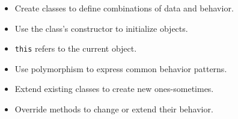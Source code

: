 \begin{itemize}
\item
  Create classes to define combinations of data and behavior.
\item
  Use the class's constructor to initialize objects.
\item
  \texttt{this} refers to the current object.
\item
  Use polymorphism to express common behavior patterns.
\item
  Extend existing classes to create new ones-sometimes.
\item
  Override methods to change or extend their behavior.
\end{itemize}
